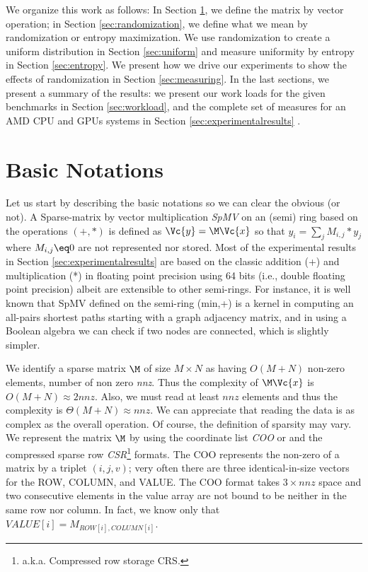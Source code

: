 \documentclass[acmsmall]{acmart}
\begin{document}
We organize this work as follows: In Section \ref{sec:notations}, we
define the matrix by vector operation; in Section
\ref{sec:randomization}, we define what we mean by randomization or
entropy maximization. We use randomization to create a uniform
distribution in Section \ref{sec:uniform} and measure uniformity
by entropy in Section \ref{sec:entropy}. We present how we drive our
experiments to show the effects of randomization in Section
\ref{sec:measuring}. In the last sections, we present a summary of the
results: we present our work loads for the given benchmarks in Section
\ref{sec:workload}, and the complete set of measures for an AMD CPU
and GPUs systems in Section \ref{sec:experimentalresults} .

\section{Basic Notations}
\label{sec:notations}
Let us start by describing the basic notations so we can clear the
obvious (or not).  A Sparse-matrix by vector multiplication {\em SpMV}
on an (semi) ring based on the operations $(+,*)$ is defined as
$\Vc{y} = \M \Vc{x}$ so that $y_i = \sum_j M_{i,j}*y_j$ where $M_{i,j}
\eq 0$ are not represented nor stored. Most of the experimental
results in Section \ref{sec:experimentalresults} are based on the
classic addition (+) and multiplication (*) in floating point
precision using 64 bits (i.e., double floating point precision) albeit
are extensible to other semi-rings.  For instance, it is well known
that SpMV defined on the semi-ring (min,+) is a kernel in computing an
all-pairs shortest paths starting with a graph adjacency matrix, and
in using a Boolean algebra we can check if two nodes are connected,
which is slightly simpler.

We identify a sparse matrix $\M$ of size $M\times N$ as having
$O(M+N)$ non-zero elements, number of non zero {\em nnz}. Thus the
complexity of $\M \Vc{x}$ is $O(M+N) \approx 2nnz$. Also, we must read
at least $nnz$ elements and thus the complexity is $\Theta(M+N)
\approx nnz$. We can appreciate that reading the data is as complex as
the overall operation. Of course, the definition of sparsity may
vary. We represent the matrix $\M$ by using the coordinate list {\em
  COO} or and the compressed sparse row {\em
  CSR}\footnote{a.k.a. Compressed row storage {\rm CRS}.}
formats. The COO represents the non-zero of a matrix by a triplet
$(i,j,v)$; very often there are three identical-in-size vectors for
the ROW, COLUMN, and VALUE. The COO format takes $3\times nnz$ space
and two consecutive elements in the value array are not bound to be
neither in the same row nor column. In fact, we know only that
$VALUE[i] = M_{ROW[i],COLUMN[i]}$.
\end{document}
